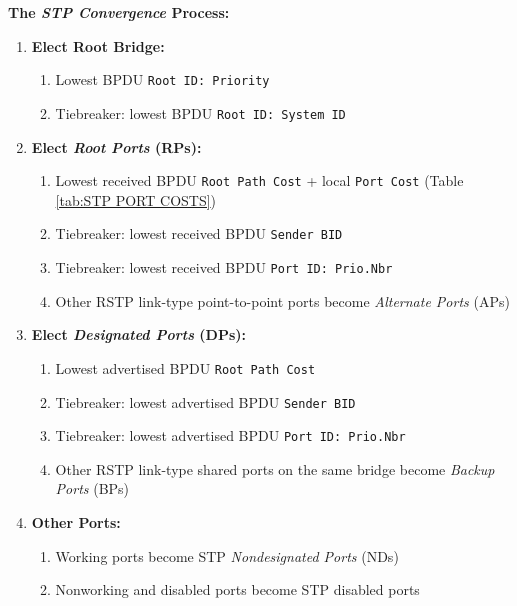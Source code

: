 \documentclass[12pt]{article}
\begin{document}
	\textbf{The \textit{STP Convergence} Process:}
	\begin{enumerate}
		\label{itm:STP CONVERGENCE}
		\item{\textbf{Elect Root Bridge:}}
		\begin{enumerate}
			\item{Lowest BPDU \texttt{Root ID: Priority}}
			\item{Tiebreaker: lowest BPDU \texttt{Root ID: System ID}}
		\end{enumerate}
		\item{\textbf{Elect \textit{Root Ports} (RPs):}}
		\begin{enumerate}
			\item{Lowest received BPDU \texttt{Root Path Cost} + local \texttt{Port Cost} (Table \ref{tab:STP PORT COSTS})}
			\item{Tiebreaker: lowest received BPDU \texttt{Sender BID}}
			\item{Tiebreaker: lowest received BPDU \texttt{Port ID: Prio.Nbr}}
			\item{Other RSTP link-type point-to-point ports become \textit{Alternate Ports} (APs)}
		\end{enumerate}
		\item{\textbf{Elect \textit{Designated Ports} (DPs):}}
		\begin{enumerate}
			\item{Lowest advertised BPDU \texttt{Root Path Cost}}
			\item{Tiebreaker: lowest advertised BPDU \texttt{Sender BID}}
			\item{Tiebreaker: lowest advertised BPDU \texttt{Port ID: Prio.Nbr}}
			\item{Other RSTP link-type shared ports on the same bridge become \textit{Backup Ports} (BPs)}
		\end{enumerate}
		\item{\textbf{Other Ports:}}
		\begin{enumerate}
			\item{Working ports become STP \textit{Nondesignated Ports} (NDs)}
			\item{Nonworking and disabled ports become STP disabled ports}
		\end{enumerate}
	\end{enumerate}
	
\end{document}
